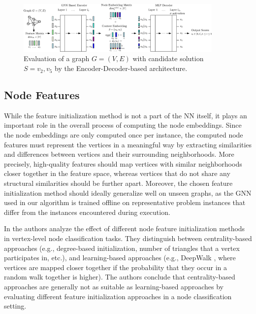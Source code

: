 \documentclass[draft,final]{vutinfth} %
\begin{document}
\begin{figure}
    \centering
    \includegraphics[width=0.9\textwidth]{graphics/gnn-architecture.eps}
    \caption{Evaluation of a graph $G = (V, E)$ with candidate solution $S = {v_2, v_5}$ by the Encoder-Decoder-based architecture. }
    \label{fig:gnn-architecture}
\end{figure}

\subsection{Node Features}
While the feature initialization method is not a part of the NN itself, it plays an important role in the overall process of computing the node embeddings. 
Since the node embeddings are only computed once per instance, the computed node features must represent the vertices in a meaningful way by extracting similarities and differences between vertices and their surrounding neighborhoods. More precisely, high-quality features should map vertices with similar neighborhoods closer together in the feature space, whereas vertices that do not share any structural similarities should be further apart. Moreover, the chosen feature initialization method should ideally generalize well on unseen graphs, as the GNN used in our algorithm is trained offline on representative problem instances that differ from the instances encountered during execution. 

In \cite{Duong2019} the authors analyze the effect of different node feature initialization methods in vertex-level node classification tasks. They distinguish between centrality-based approaches (e.g., degree-based initialization, number of triangles that a vertex participates in, etc.), and learning-based approaches (e.g., DeepWalk \cite{Perozzi2014}, where vertices are mapped closer together if the probability that they occur in a random walk together is higher). 
The authors conclude that centrality-based approaches are generally not as suitable as learning-based approaches by evaluating different feature initialization approaches in a node classification setting. 
\end{document}
